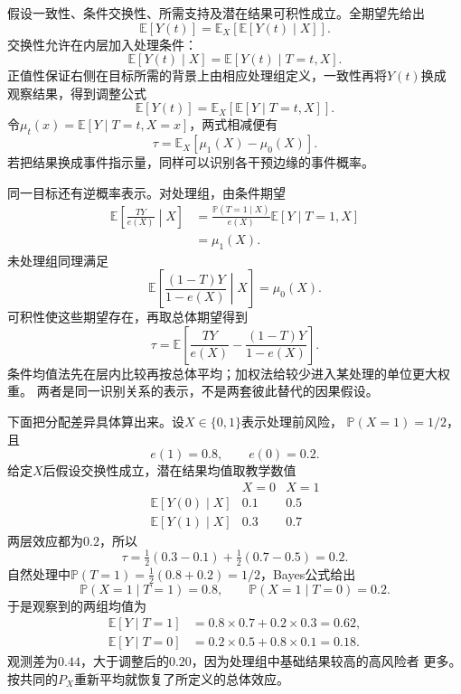 假设一致性、条件交换性、所需支持及潜在结果可积性成立。全期望先给出
\[
  \mathbb E[Y(t)]
  =\mathbb E_X[\mathbb E[Y(t)\mid X]].
\]
交换性允许在内层加入处理条件：
\[
  \mathbb E[Y(t)\mid X]
  =\mathbb E[Y(t)\mid T=t,X].
\]
正值性保证右侧在目标所需的背景上由相应处理组定义，一致性再将\(Y(t)\)换成
观察结果，得到调整公式
\begin{equation}
  \mathbb E[Y(t)]
  =\mathbb E_X[\mathbb E[Y\mid T=t,X]].
  \label{eq:causal-g-formula}
\end{equation}
令\(\mu_t(x)=\mathbb E[Y\mid T=t,X=x]\)，两式相减便有
\begin{equation}
  \tau=\mathbb E_X[\mu_1(X)-\mu_0(X)].
  \label{eq:causal-ate-adjustment}
\end{equation}
若把结果换成事件指示量，同样可以识别各干预边缘的事件概率。

同一目标还有逆概率表示。对处理组，由条件期望
\[
  \begin{aligned}
    \mathbb E\left[\frac{TY}{e(X)}\middle|X\right]
    &=
    \frac{\mathbb P(T=1\mid X)}{e(X)}
      \mathbb E[Y\mid T=1,X]\\
    &=\mu_1(X).
  \end{aligned}
\]
未处理组同理满足
\[
  \mathbb E\left[\frac{(1-T)Y}{1-e(X)}\middle|X\right]
  =\mu_0(X).
\]
可积性使这些期望存在，再取总体期望得到
\begin{equation}
  \tau=\mathbb E\left[
    \frac{TY}{e(X)}-\frac{(1-T)Y}{1-e(X)}
  \right].
  \label{eq:causal-ipw-identification}
\end{equation}
条件均值法先在层内比较再按总体平均；加权法给较少进入某处理的单位更大权重。
两者是同一识别关系的表示，不是两套彼此替代的因果假设。

下面把分配差异具体算出来。设\(X\in\{0,1\}\)表示处理前风险，
\(\mathbb P(X=1)=1/2\)，且
\[
  e(1)=0.8,\qquad e(0)=0.2.
\]
给定\(X\)后假设交换性成立，潜在结果均值取教学数值
\[
  \begin{array}{c|cc}
    &X=0&X=1\\ \hline
    \mathbb E[Y(0)\mid X]&0.1&0.5\\
    \mathbb E[Y(1)\mid X]&0.3&0.7
  \end{array}
\]
两层效应都为\(0.2\)，所以
\[
  \tau=\tfrac12(0.3-0.1)+\tfrac12(0.7-0.5)=0.2.
\]
自然处理中\(\mathbb P(T=1)=\tfrac12(0.8+0.2)=1/2\)，Bayes公式给出
\[
  \mathbb P(X=1\mid T=1)=0.8,\qquad
  \mathbb P(X=1\mid T=0)=0.2.
\]
于是观察到的两组均值为
\[
  \begin{aligned}
    \mathbb E[Y\mid T=1]&=0.8\times0.7+0.2\times0.3=0.62,\\
    \mathbb E[Y\mid T=0]&=0.2\times0.5+0.8\times0.1=0.18.
  \end{aligned}
\]
观测差为\(0.44\)，大于调整后的\(0.20\)，因为处理组中基础结果较高的高风险者
更多。按共同的\(P_X\)重新平均就恢复了所定义的总体效应。

